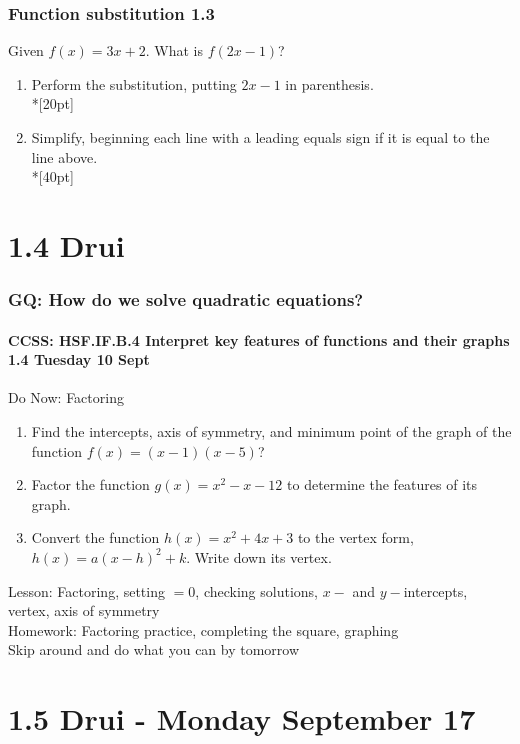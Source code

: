 \documentclass{beamer}
\begin{document}
\frame
{
  \frametitle{Function substitution  \alert{1.3}}
  Given $f(x)=3x+2$. What is $f(2x-1)$? \bigskip
    \begin{enumerate}
        \item Perform the substitution, putting $2x-1$ in parenthesis.\\*[20pt]
        \item Simplify, beginning each line with a leading equals sign if it is equal to the line above.\\*[40pt]
  \end{enumerate}
  }

  \section{1.4 Drui}
  \frame
  {
    \frametitle{GQ: How do we solve quadratic equations?}
    \framesubtitle{CCSS: HSF.IF.B.4 Interpret key features of functions and their graphs \hfill \alert{1.4 Tuesday 10 Sept}}

    \begin{block}{Do Now: Factoring}
    \begin{enumerate}
      \item Find the intercepts, axis of symmetry, and minimum point of the graph of the function $f(x)=(x-1)(x-5)$?
      \item Factor the function $g(x)=x^2-x-12$ to determine the features of its graph.
      \item Convert the function $h(x)=x^2+4x+3$ to the vertex form, $h(x)=a(x-h)^2+k$. Write down its vertex.
    \end{enumerate}
    \end{block}
    Lesson: Factoring, setting $=0$, checking solutions, $x-$ and $y-$intercepts, vertex, axis of symmetry
    \\ \bigskip
    Homework: Factoring practice, completing the square, graphing\\
    Skip around and do what you can by tomorrow
  }

  \section{1.5 Drui - Monday September 17}
\end{document}
